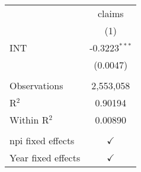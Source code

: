 
\begingroup
\centering
\begin{tabular}{lc}
   \toprule
                      & claims\\  
                      & (1)\\  
   \midrule 
   INT                & -0.3223$^{***}$\\   
                      & (0.0047)\\   
    \\
   Observations       & 2,553,058\\  
   R$^2$              & 0.90194\\  
   Within R$^2$       & 0.00890\\  
    \\
   npi fixed effects  & $\checkmark$\\   
   Year fixed effects & $\checkmark$\\   
   \bottomrule
\end{tabular}
\par\endgroup


